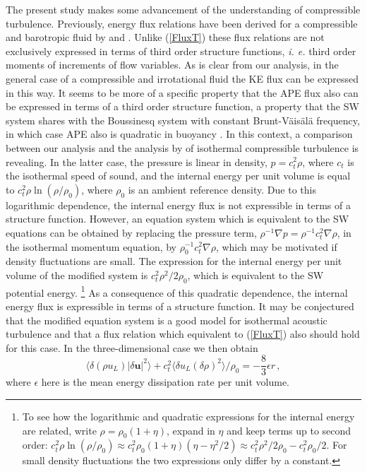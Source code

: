 \documentclass{jfm}
\newcommand{\uu}{\textbf{u}}
\newcommand{\meane}[1]{\langle #1 \rangle}
\begin{document}
 The present study makes some advancement of the understanding of compressible turbulence. Previously, energy flux relations  have 
 been derived  for a compressible and barotropic fluid by \cite{Falkovich2010} and \cite{Galtier2011}.  Unlike (\ref{FluxT}) these flux relations are not exclusively expressed in terms of third order structure functions, {\em i. e.} third order moments of increments of flow variables. 
As is clear from our analysis, in the general case of a compressible and irrotational fluid the KE flux can be expressed in this way.  It seems to be more of a specific property that the APE flux also can be expressed in terms of a third order structure function, a property that the SW system shares with the Boussinesq system with constant Brunt-V\"ais\"al\"a frequency, in which case APE also is quadratic in buoyancy \cite[]{Augier2012}. 
In this context,  a comparison between our analysis and the analysis  by \cite{Galtier2011} of  isothermal compressible turbulence  is revealing. In the latter case, the pressure is linear in density, $ p = c_t^2 \rho $, where $ c_t $ is the isothermal speed of sound, and the internal energy per unit volume is  equal to $ c_t^2 \rho \ln (\rho/ \rho_0) $, where $ \rho_0 $ is an ambient reference density. Due to this  logarithmic dependence, the internal energy flux is not expressible in terms of a structure function. However, an equation system which is equivalent to the SW equations can be obtained by replacing the pressure term, $ \rho^{-1} \nabla p = \rho^{-1} c_t^{2} \nabla \rho $, in the isothermal momentum equation, by $ \rho_{0}^{-1} c_t^{2} \nabla \rho $, which may be motivated if density fluctuations are small. The expression for the internal energy per unit volume of the modified system is  $ c_t^2 \rho^2/2\rho_{0} $, which is equivalent to the SW potential energy. \footnote{To see how the logarithmic and quadratic expressions for the internal energy are 
 related, write $ \rho = \rho_0(1+\eta) $, expand in $ \eta $ and keep  terms up to second order: 
 $ c_t^2\rho \ln(\rho/\rho_0) \approx c_t^2 \rho_0(1+\eta)(\eta - \eta^2/2) \approx   c_t^2 \rho^2/2 \rho_0 - c_t^2 \rho_0/2 $. 
For small density fluctuations the two expressions only differ by a constant.} As a consequence of this quadratic dependence, the internal energy flux is expressible in terms of a structure function. It may be conjectured that the modified equation system is a good model for isothermal acoustic turbulence and that a flux relation which  equivalent to (\ref{FluxT}) also should hold for this case. In the three-dimensional case we then obtain
 \begin{equation}
\meane{ \delta (\rho u_L)    |\delta \uu|^2  }
+ c_t^2\meane{ \delta u_L(\delta \rho)^2  } /\rho_0 = - \frac{8}{3} \epsilon r \, ,\label{eq_Kolmo3}
\end{equation}
where  $ \epsilon $ here is the mean energy dissipation rate per unit volume.  
\end{document}
